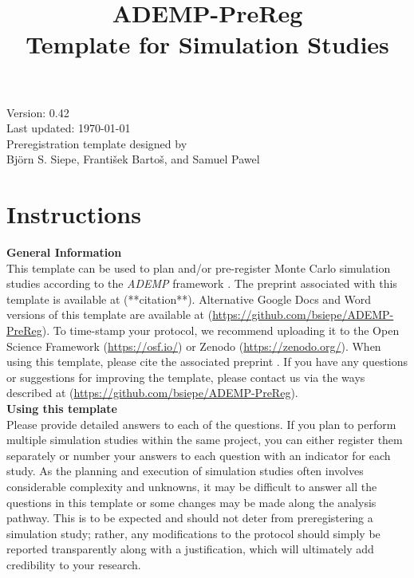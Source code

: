 \documentclass[12pt]{article}
\title{ADEMP-PreReg \\ Template for Simulation Studies}
\begin{document}
\begin{titlepage}
    \maketitle
    \vfill 
    \centering
    Version: 0.42 \\
    Last updated: \today \\
    Preregistration template designed by \\ 
    Björn S. Siepe, František Bartoš, and Samuel Pawel \\
    \vfill 
\end{titlepage}

\newpage



\section{Instructions}
\textbf{General Information}\\
This template can be used to plan and/or pre-register Monte Carlo simulation studies according to the \textit{ADEMP} framework \parencite{Morris2019}. The preprint associated with this template is available at (**citation**). Alternative Google Docs and Word versions of this template are available at (\url{https://github.com/bsiepe/ADEMP-PreReg}). To time-stamp your protocol, we recommend uploading it to the Open Science Framework (\url{https://osf.io/}) or Zenodo (\url{https://zenodo.org/}). When using this template, please cite the associated preprint \parencite{Siepe2023}. If you have any questions or suggestions for improving the template, please contact us via the ways described at (\url{https://github.com/bsiepe/ADEMP-PreReg}). \\

\noindent \textbf{Using this template} \\
Please provide detailed answers to each of the questions. If you plan to perform multiple simulation studies within the same project, you can either register them separately or number your answers to each question with an indicator for each study. As the planning and execution of simulation studies often involves considerable complexity and unknowns, it may be difficult to answer all the questions in this template or some changes may be made along the analysis pathway. This is to be expected and should not deter from preregistering a simulation study; rather, any modifications to the protocol should simply be reported transparently along with a justification, which will ultimately add credibility to your research.
\end{document}
